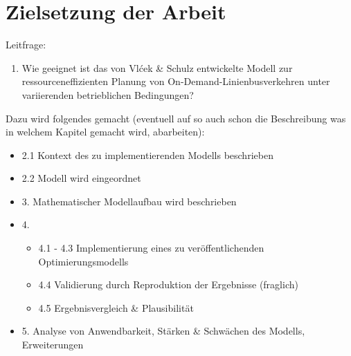 \section{Zielsetzung der Arbeit}
\label{sec:1.2}
Leitfrage:
\begin{enumerate}
    \item Wie geeignet ist das von Vlćek \& Schulz entwickelte Modell zur ressourceneffizienten Planung von On-Demand-Linienbusverkehren unter variierenden betrieblichen Bedingungen?
\end{enumerate}
\vspace{1em}
Dazu wird folgendes gemacht (eventuell auf so auch schon die Beschreibung was in welchem Kapitel gemacht wird, abarbeiten):
\begin{itemize}
    \item 2.1 Kontext des zu implementierenden Modells beschrieben
    \item 2.2 Modell wird eingeordnet
    \item 3. Mathematischer Modellaufbau wird beschrieben
    \item 4. 
    \begin{itemize}
        \item 4.1 - 4.3 Implementierung eines zu veröffentlichenden Optimierungsmodells
        \item 4.4 Validierung durch Reproduktion der Ergebnisse (fraglich)
        \item 4.5 Ergebnisvergleich \& Plausibilität
    \end{itemize} 
    \item 5. Analyse von Anwendbarkeit, Stärken \& Schwächen des Modells, Erweiterungen
\end{itemize}
